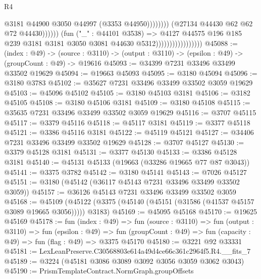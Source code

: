 \begin{lexlean}{R4}
\begin{coremodule}
                                                            @3181
                                                            @44900
                                                            @3050
                                                            @44997
                                                            (@3353 @44950))))))))
                                              (@27134 @44430 @62 @62 @72 @44430))))))
                                    (fun ("_" : @44101 @3538) =>
                                    @4127
                                      @44575
                                      @196
                                      @185
                                      @239
                                      @3181
                                      @3181
                                      @3050
                                      @3081
                                      @44630
                                      @5312)))))))))))))))))
@45088 := (index : @49) ->
  (source : @3110) -> (output : @3110) -> (epsilon : @49) -> (groupCount : @49) -> @19616
@45093 := @34399 @7231 @33496 @33499 @33502 @19629
@45094 := @19663 @45093
@45095 := @3180 @45094
@45096 := @3180 @3783
@45102 := @35627 @7231 @33496 @33499 @33502 @3059 @19629
@45103 := @45096 @45102
@45105 := @3180 @45103 @3181
@45106 := @3182 @45105
@45108 := @3180 @45106 @3181
@45109 := @3180 @45108
@45115 := @35635 @7231 @33496 @33499 @33502 @3059 @19629
@45116 := @3707 @45115
@45117 := @3379 @45116
@45118 := @45117 @3181
@45119 := @3377 @45118
@45121 := @3386 @45116 @3181
@45122 := @45119 @45121
@45127 := @34406 @7231 @33496 @33499 @33502 @19629
@45128 := @3707 @45127
@45130 := @3379 @45128 @3181
@45131 := @3377 @45130
@45133 := @3386 @45128 @3181
@45140 := @45131 @45133 (@19663 (@33286 @19665 @77 @87 @3043))
@45141 := @3375 @3782
@45142 := @3180 @45141
@45143 := @7026 @45127
@45151 := @3180 (@45142 (@36117 @45143 @7231 @33496 @33499 @33502 @3059))
@45157 := @36126 @45143 @7231 @33496 @33499 @33502 @3059
@45168 := @45109
    (@45122 (@3375 (@45140 (@45151 (@31586 (@41537 @45157 @3089 @19665 @3056))))) @3183)
@45169 := @45095 @45168
@45170 := @19625 @45169
@45178 := fun (index : @49) =>
  fun (source : @3110) =>
  fun (output : @3110) =>
  fun (epsilon : @49) =>
  fun (groupCount : @49) => fun (capacity : @49) => fun (flag : @49) => @3375 @45170
@45180 := @3221 @92 @33331
@45181 := LexLeanPreserve.C30568803e614a49d4ce66c361c2964f5.R4.__fits_7
@45189 := @3224 (@45181 @3086 @3089 @3092 @3056 @3059 @3062 @3043)
@45190 := PrismTemplateContract.NormGraph.groupOffsets

\end{coremodule}
\end{lexlean}
